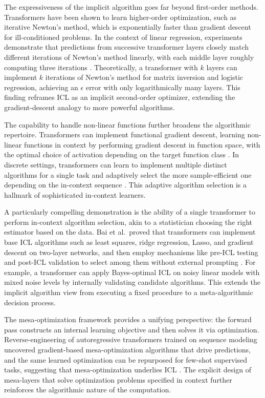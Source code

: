 \documentclass[11pt]{article}
\begin{document}
The expressiveness of the implicit algorithm goes far beyond first-order methods. Transformers have been shown to learn higher-order optimization, such as iterative Newton's method, which is exponentially faster than gradient descent for ill-conditioned problems. In the context of linear regression, experiments demonstrate that predictions from successive transformer layers closely match different iterations of Newton's method linearly, with each middle layer roughly computing three iterations \cite{ref6}. Theoretically, a transformer with \(k\) layers can implement \(k\) iterations of Newton's method for matrix inversion and logistic regression, achieving an \(\epsilon\) error with only logarithmically many layers. This finding reframes ICL as an implicit second-order optimizer, extending the gradient-descent analogy to more powerful algorithms.

The capability to handle non-linear functions further broadens the algorithmic repertoire. Transformers can implement functional gradient descent, learning non-linear functions in context by performing gradient descent in function space, with the optimal choice of activation depending on the target function class \cite{ref58}. In discrete settings, transformers can learn to implement multiple distinct algorithms for a single task and adaptively select the more sample-efficient one depending on the in-context sequence \cite{ref8}. This adaptive algorithm selection is a hallmark of sophisticated in-context learners.

A particularly compelling demonstration is the ability of a single transformer to perform in-context algorithm selection, akin to a statistician choosing the right estimator based on the data. Bai et al.~proved that transformers can implement base ICL algorithms such as least squares, ridge regression, Lasso, and gradient descent on two-layer networks, and then employ mechanisms like pre-ICL testing and post-ICL validation to select among them without external prompting \cite{ref7}. For example, a transformer can apply Bayes-optimal ICL on noisy linear models with mixed noise levels by internally validating candidate algorithms. This extends the implicit algorithm view from executing a fixed procedure to a meta-algorithmic decision process.

The mesa-optimization framework provides a unifying perspective: the forward pass constructs an internal learning objective and then solves it via optimization. Reverse-engineering of autoregressive transformers trained on sequence modeling uncovered gradient-based mesa-optimization algorithms that drive predictions, and the same learned optimization can be repurposed for few-shot supervised tasks, suggesting that mesa-optimization underlies ICL \cite{ref59}. The explicit design of mesa-layers that solve optimization problems specified in context further reinforces the algorithmic nature of the computation.
\end{document}
